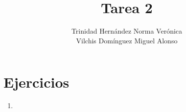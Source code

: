 \documentclass[11 pt, a4paper]{article}
\author{Trinidad Hern\'andez Norma Ver\'onica \\
        Vilchis Dom\'inguez Miguel Alonso}
\title{Tarea 2}
\theoremstyle{definition}
\begin{document}
\maketitle

\section{Ejercicios}

\begin{enumerate}
 \item 
\end{enumerate}
\end{document}
